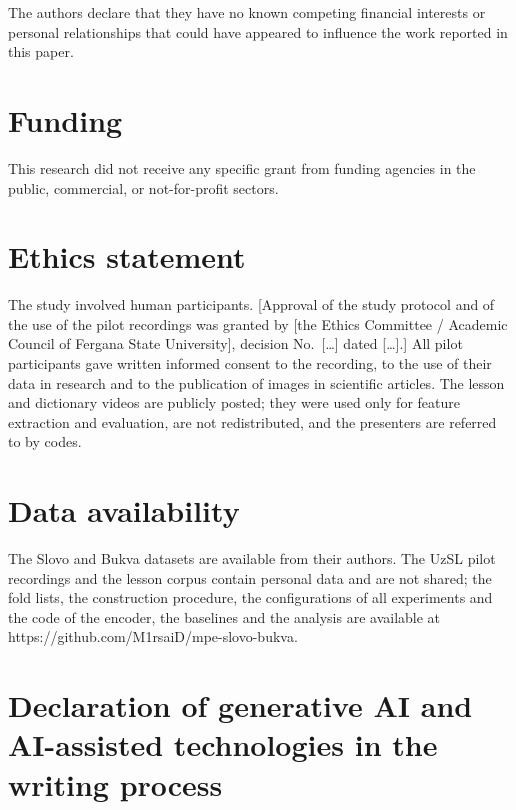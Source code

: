 \documentclass[a4paper,fleqn]{cas-dc}
\begin{document}
The authors declare that they have no known competing financial interests or personal relationships that could have appeared to influence the work reported in this paper.

\hypertarget{funding}{%
\section*{Funding}\label{funding}}

This research did not receive any specific grant from funding agencies in the public, commercial, or not-for-profit sectors.

\hypertarget{ethics-statement}{%
\section*{Ethics statement}\label{ethics-statement}}

The study involved human participants. {\color{red}[Approval of the study protocol and of the use of the pilot recordings was granted by {\color{red}[the Ethics Committee / Academic Council of Fergana State University]}, decision No.~{\color{red}[\ldots]} dated {\color{red}[\ldots]}.]} All pilot participants gave written informed consent to the recording, to the use of their data in research and to the publication of images in scientific articles. The lesson and dictionary videos are publicly posted; they were used only for feature extraction and evaluation, are not redistributed, and the presenters are referred to by codes.

\hypertarget{data-availability}{%
\section*{Data availability}\label{data-availability}}

The Slovo and Bukva datasets are available from their authors. The UzSL pilot recordings and the lesson corpus contain personal data and are not shared; the fold lists, the construction procedure, the configurations of all experiments and the code of the encoder, the baselines and the analysis are available at https://github.com/M1rsaiD/mpe-slovo-bukva.

\hypertarget{declaration-of-generative-ai-and-ai-assisted-technologies-in-the-writing-process}{%
\section*{Declaration of generative AI and AI-assisted technologies in the writing process}\label{declaration-of-generative-ai-and-ai-assisted-technologies-in-the-writing-process}}
\end{document}

